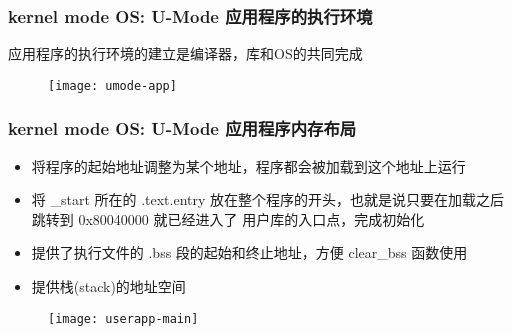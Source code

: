 \begin{frame}
	\frametitle{kernel mode OS: U-Mode 应用程序的执行环境}
%		
%		

应用程序的执行环境的建立是编译器，库和OS的共同完成
	\begin{figure}
        \centering
        \texttt{[image: umode-app]}
    \end{figure}
\end{frame}

\begin{frame}
    \frametitle{kernel mode OS: U-Mode 应用程序内存布局}
    	\begin{itemize}
    		
    		\item 将程序的起始地址调整为某个地址，程序都会被加载到这个地址上运行
    		
    		\item 将 \_start 所在的 .text.entry 放在整个程序的开头，也就是说只要在加载之后跳转到 0x80040000 就已经进入了 用户库的入口点，完成初始化
            \item 提供了执行文件的 .bss 段的起始和终止地址，方便 clear\_bss 函数使用
            \item 提供栈(stack)的地址空间
    		
    	\end{itemize}	
    \begin{figure}
        \centering
        \texttt{[image: userapp-main]}
    \end{figure}
\end{frame}

